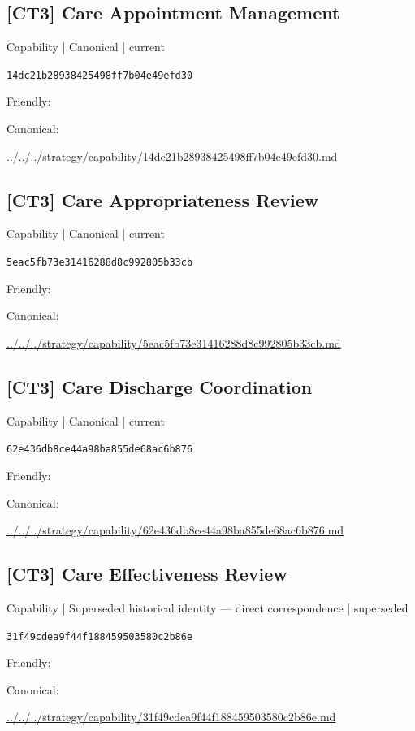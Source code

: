 \documentclass[10pt,a4paper]{article}
\begin{document}
\subsection*{[CT3] Care Appointment Management}
{\small Capability | Canonical | current}\par
\texttt{14dc21b28938425498ff7b04e49efd30}\par
Friendly: \par
Canonical: \par
{\footnotesize\url{../../../strategy/capability/14dc21b28938425498ff7b04e49efd30.md}}\par
\subsection*{[CT3] Care Appropriateness Review}
{\small Capability | Canonical | current}\par
\texttt{5eac5fb73e31416288d8c992805b33cb}\par
Friendly: \par
Canonical: \par
{\footnotesize\url{../../../strategy/capability/5eac5fb73e31416288d8c992805b33cb.md}}\par
\subsection*{[CT3] Care Discharge Coordination}
{\small Capability | Canonical | current}\par
\texttt{62e436db8ce44a98ba855de68ac6b876}\par
Friendly: \par
Canonical: \par
{\footnotesize\url{../../../strategy/capability/62e436db8ce44a98ba855de68ac6b876.md}}\par
\subsection*{[CT3] Care Effectiveness Review}
{\small Capability | Superseded historical identity — direct correspondence | superseded}\par
\texttt{31f49cdea9f44f188459503580c2b86e}\par
Friendly: \par
Canonical: \par
{\footnotesize\url{../../../strategy/capability/31f49cdea9f44f188459503580c2b86e.md}}\par
\end{document}
